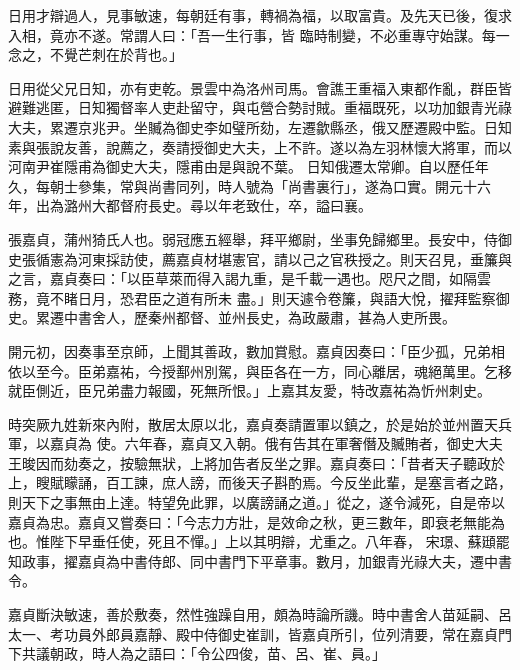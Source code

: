 \begin{pinyinscope}
 日用才辯過人，見事敏速，每朝廷有事，轉禍為福，以取富貴。及先天已後，復求入相，竟亦不遂。常謂人曰：「吾一生行事，皆
 臨時制變，不必重專守始謀。每一念之，不覺芒刺在於背也。」



 日用從父兄日知，亦有吏乾。景雲中為洛州司馬。會譙王重福入東都作亂，群臣皆避難逃匿，日知獨督率人吏赴留守，與屯營合勢討賊。重福既死，以功加銀青光祿大夫，累遷京兆尹。坐贓為御史李如璧所劾，左遷歙縣丞，俄又歷遷殿中監。日知素與張說友善，說薦之，奏請授御史大夫，上不許。遂以為左羽林懷大將軍，而以河南尹崔隱甫為御史大夫，隱甫由是與說不葉。
 日知俄遷太常卿。自以歷任年久，每朝士參集，常與尚書同列，時人號為「尚書裏行」，遂為口實。開元十六年，出為潞州大都督府長史。尋以年老致仕，卒，謚曰襄。



 張嘉貞，蒲州猗氏人也。弱冠應五經舉，拜平鄉尉，坐事免歸鄉里。長安中，侍御史張循憲為河東採訪使，薦嘉貞材堪憲官，請以己之官秩授之。則天召見，垂簾與之言，嘉貞奏曰：「以臣草萊而得入謁九重，是千載一遇也。咫尺之間，如隔雲務，竟不睹日月，恐君臣之道有所未
 盡。」則天遽令卷簾，與語大悅，擢拜監察御史。累遷中書舍人，歷秦州都督、並州長史，為政嚴肅，甚為人吏所畏。



 開元初，因奏事至京師，上聞其善政，數加賞慰。嘉貞因奏曰：「臣少孤，兄弟相依以至今。臣弟嘉祐，今授鄯州別駕，與臣各在一方，同心離居，魂絕萬里。乞移就臣側近，臣兄弟盡力報國，死無所恨。」上嘉其友愛，特改嘉祐為忻州刺史。



 時突厥九姓新來內附，散居太原以北，嘉貞奏請置軍以鎮之，於是始於並州置天兵軍，以嘉貞為
 使。六年春，嘉貞又入朝。俄有告其在軍奢僭及贓賄者，御史大夫王晙因而劾奏之，按驗無狀，上將加告者反坐之罪。嘉貞奏曰：「昔者天子聽政於上，瞍賦矇誦，百工諫，庶人謗，而後天子斟酌焉。今反坐此輩，是塞言者之路，則天下之事無由上達。特望免此罪，以廣謗誦之道。」從之，遂令減死，自是帝以嘉貞為忠。嘉貞又嘗奏曰：「今志力方壯，是效命之秋，更三數年，即衰老無能為也。惟陛下早垂任使，死且不憚。」上以其明辯，尤重之。八年春，
 宋璟、蘇頲罷知政事，擢嘉貞為中書侍郎、同中書門下平章事。數月，加銀青光祿大夫，遷中書令。



 嘉貞斷決敏速，善於敷奏，然性強躁自用，頗為時論所譏。時中書舍人苗延嗣、呂太一、考功員外郎員嘉靜、殿中侍御史崔訓，皆嘉貞所引，位列清要，常在嘉貞門下共議朝政，時人為之語曰：「令公四俊，苗、呂、崔、員。」




\end{pinyinscope}
